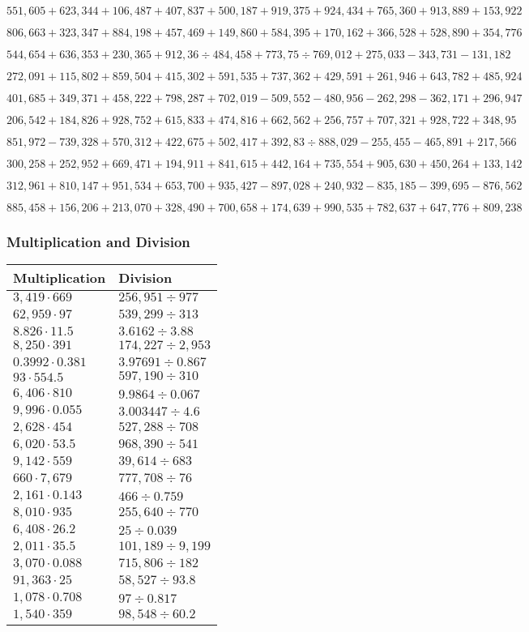 \(551,605+623,344+106,487+407,837+500,187+919,375+924,434+765,360+913,889+ 153,922\)

\(806,663+323,347+884,198+457,469+149,860+584,395+170,162+366,528+528,890+354,776\)

\(544,654+636,353+230,365+912,36÷484,458+773,75÷769,012+275,033-343,731-131,182\)

\(272,091+115,802+859,504+415,302+591,535+737,362+429,591+261,946+643,782+485,924\)

\(401,685+349,371+458,222+798,287+702,019-509,552-480,956-262,298-362,171+296,947\)

\(206,542+184,826+928,752+615,833+474,816+662,562+256,757+707,321+928,722+348,95\)

\(851,972-739,328+570,312+422,675+502,417+392,83÷888,029-255,455-465,891+217,566\)

\(300,258+252,952+669,471+194,911+841,615+442,164+735,554+905,630+450,264+133,142\)

\(312,961+810,147+951,534+653,700+935,427-897,028+240,932-835,185-399,695-876,562\)

\(885,458+156,206+213,070+328,490+700,658+174,639+990,535+782,637+647,776+809,238\)

\hypertarget{multiplication-and-division-343}{%
\subsubsection{Multiplication and
Division}\label{multiplication-and-division-343}}

\begin{longtable}[]{@{}ll@{}}
\toprule
Multiplication & Division\tabularnewline
\midrule
\endhead
\(3,419\cdot669\) & \(256,951÷977\)\tabularnewline
\(62,959\cdot97\) & \(539,299÷313\)\tabularnewline
\(8.826\cdot11.5\) & \(3.6162÷3.88\)\tabularnewline
\(8,250\cdot391\) & \(174,227÷2,953\)\tabularnewline
\(0.3992\cdot0.381\) & \(3.97691÷0.867\)\tabularnewline
\(93\cdot554.5\) & \(597,190÷310\)\tabularnewline
\(6,406\cdot810\) & \(9.9864÷0.067\)\tabularnewline
\(9,996\cdot0.055\) & \(3.003447÷4.6\)\tabularnewline
\(2,628\cdot454\) & \(527,2 8 8÷7 08\)\tabularnewline
\(6,020\cdot53.5\) & \(968,390÷541\)\tabularnewline
\(9,142\cdot559\) & \(39,614÷683\)\tabularnewline
\(660\cdot7,679\) & \(777,708÷76\)\tabularnewline
\(2,161\cdot0.143\) & \(466÷0.759\)\tabularnewline
\(8,010\cdot935\) & \(255,640÷770\)\tabularnewline
\(6,408\cdot26.2\) & \(25÷0.039\)\tabularnewline
\(2,011\cdot35.5\) & \(101,189÷9,199\)\tabularnewline
\(3,070\cdot0.088\) & \(715,806÷182\)\tabularnewline
\(91,363\cdot25\) & \(58,527÷93.8\)\tabularnewline
\(1,078\cdot0.708\) & \(97÷0.817\)\tabularnewline
\(1,540\cdot359\) & \(98,548÷60.2\)\tabularnewline
\bottomrule
\end{longtable}

